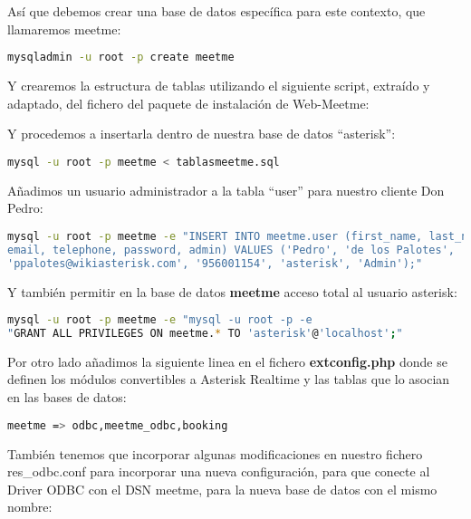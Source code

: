 Así que debemos crear una base de datos específica para este contexto, que llamaremos meetme:

\begin{lstlisting}[language=sh]
mysqladmin -u root -p create meetme
\end{lstlisting}

Y crearemos la estructura de tablas utilizando el siguiente script, extraído y adaptado, del fichero del paquete de instalación de Web-Meetme:



Y procedemos a insertarla dentro de nuestra base de datos ``asterisk'':

\begin{lstlisting}[language=sh]
mysql -u root -p meetme < tablasmeetme.sql
\end{lstlisting}

Añadimos un usuario administrador a la tabla ``user'' para nuestro cliente Don Pedro:

\begin{lstlisting}[language=sh]
mysql -u root -p meetme -e "INSERT INTO meetme.user (first_name, last_name, 
email, telephone, password, admin) VALUES ('Pedro', 'de los Palotes', 
'ppalotes@wikiasterisk.com', '956001154', 'asterisk', 'Admin');"
\end{lstlisting}

Y también permitir en la base de datos \textbf{meetme} acceso total al usuario asterisk:

\begin{lstlisting}[language=sh]
mysql -u root -p meetme -e "mysql -u root -p -e 
"GRANT ALL PRIVILEGES ON meetme.* TO 'asterisk'@'localhost';"
\end{lstlisting}

Por otro lado añadimos la siguiente linea en el fichero \textbf{extconfig.php} donde se definen los módulos convertibles a Asterisk Realtime y las tablas que lo asocian en las bases de datos:

\begin{lstlisting}[language=bash,title={/etc/asterisk/extconfig.conf}]
meetme => odbc,meetme_odbc,booking
\end{lstlisting}

También tenemos que incorporar algunas modificaciones en nuestro fichero res\_odbc.conf para incorporar una nueva configuración, para que conecte al Driver ODBC con el DSN meetme, para la nueva base de datos con el mismo nombre:

